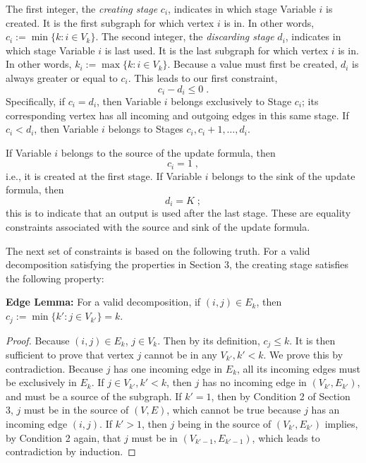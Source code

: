 \documentclass[review]{siamart0216}
\begin{document}
The first integer, the {\it creating stage} $c_i$,
indicates in which stage Variable $i$ is created.
It is the first subgraph for which vertex $i$ is in.
In other words, $c_i := \min \{ k: i\in V_k\}$.
The second integer, the {\it discarding stage} $d_i$,
indicates in which stage Variable $i$ is last used.
It is the last subgraph for which vertex $i$ is in.
In other words, $k_i := \max \{ k: i\in V_k\}$.  Because
a value must first be created, $d_i$ is always
greater or equal to $c_i$.  This leads to our first constraint,
\begin{equation} \label{cond1}
    c_i - d_i \le 0\;.
\end{equation}
Specifically, if $c_i=d_i$, then
Variable $i$ belongs exclusively to Stage $c_i$; its corresponding vertex
has all incoming and outgoing edges in this same stage.
If $c_i<d_i$, then Variable $i$ belongs to Stages $c_i, c_i+1, \ldots, d_i$.

If Variable $i$ belongs to the source of the update formula, then
\begin{equation}
    c_i = 1\;,
\end{equation}
i.e., it is created at the first stage.
If Variable $i$ belongs to the sink of the update formula, then
\begin{equation}
    d_i = K\;;
\end{equation}
this is to indicate that an output is used after the last stage.
These are equality constraints associated with the source and sink of
the update formula.

The next set of constraints is based on the following truth.
For a valid decomposition satisfying the properties in Section 3,
the creating stage satisfies the following property:

{\bf Edge Lemma:}  
For a valid decomposition,
if $(i,j)\in E_k$, then $c_j:=\min \{ k': j\in V_{k'}\}=k$.

\begin{proof} Because $(i,j)\in E_k$, $j \in V_k$.
Then by its definition, $c_j \le k$.
It is then sufficient to prove that vertex $j$ cannot be in any $V_{k'}, k'<k$.
We prove this by contradiction.  Because $j$ has one incoming edge in $E_k$,
all its incoming edges must be exclusively in $E_k$.  If $j\in V_{k'}, k'<k$,
then $j$ has no incoming edge in $(V_{k'}, E_{k'})$, and must be a source
of the subgraph.  If $k'=1$, then by Condition 2 of Section 3, $j$ must
be in the source of $(V,E)$, which cannot be true because $j$ has an
incoming edge $(i,j)$.  If $k'>1$, then $j$ being in the source of 
$(V_{k'}, E_{k'})$ implies, by Condition 2 again, that $j$ must be in
$(V_{k'-1}, E_{k'-1})$, which leads to contradiction by induction.
\end{proof}
\end{document}
